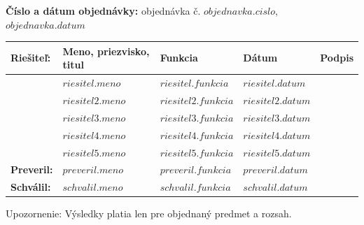 \begin{titlepage}
  {\hspace*{0em}\textbf{Číslo a dátum objednávky: }\textnormal{objednávka č. $objednavka.cislo$, $objednavka.datum$}}

\vspace*{2em}
\begin{table}[h!] %
\centering
\renewcommand{\arraystretch}{1.25} %
  \begin{tabular}{|l|l|l|l|l|}
\hline
   \textbf{Riešiteľ:} & \textbf{Meno, priezvisko, titul} & \textbf{Funkcia}     & \textbf{Dátum}     & \textbf{Podpis} \\ \hline
\multirow{5}{*}{}  & $riesitel.meno$                     & $riesitel.funkcia$   & $riesitel.datum$   &                 \\ \cline{2-5}
                   & $riesitel2.meno$                    & $riesitel2.funkcia$  & $riesitel2.datum$  &                 \\ \cline{2-5}
                   & $riesitel3.meno$                    & $riesitel3.funkcia$  & $riesitel3.datum$  &                 \\ \cline{2-5}
                   & $riesitel4.meno$                    & $riesitel4.funkcia$  & $riesitel4.datum$  &                 \\ \cline{2-5}
                   & $riesitel5.meno$                    & $riesitel5.funkcia$  & $riesitel5.datum$  &                 \\ \hline
\textbf{Preveril:} & $preveril.meno$                     & $preveril.funkcia$   & $preveril.datum$   &                 \\ \hline
\textbf{Schválil:} & $schvalil.meno$                     & $schvalil.funkcia$   & $schvalil.datum$   &                 \\ \hline
\end{tabular}
\end{table}


  {Upozornenie: Výsledky platia len pre objednaný predmet a rozsah.}


\end{titlepage}


